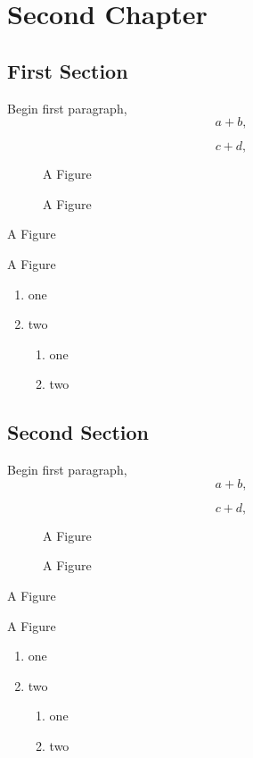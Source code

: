 \documentclass{book}
\begin{document}
\chapter{Second Chapter}
\section{First Section}
Begin first paragraph,
\begin{equation}
 a + b,
\end{equation}

\begin{equation}
 c + d,
\end{equation}

\begin{figure}
A Figure
\caption{A Figure}
\end{figure}

\begin{table}
A Figure
\caption{A Figure}
\end{table}

\begin{enumerate}
 \item one
 \item two
   \begin{enumerate}
    \item one
    \item two
   \end{enumerate}
\end{enumerate}

\section{Second Section}
Begin first paragraph,
\begin{equation}
 a + b,
\end{equation}

\begin{equation}
 c + d,
\end{equation}

\begin{figure}
A Figure
\caption{A Figure}
\end{figure}

\begin{table}
A Figure
\caption{A Figure}
\end{table}

\begin{enumerate}
 \item one
 \item two
   \begin{enumerate}
    \item one
    \item two
   \end{enumerate}
\end{enumerate}
\end{document}
